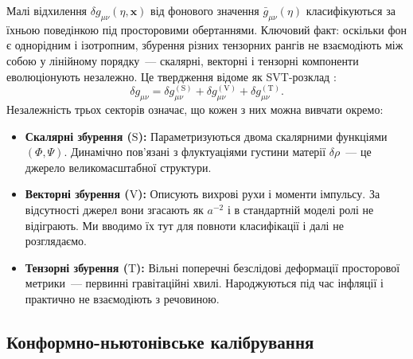\documentclass[12pt, a4paper]{article}
\begin{document}
Малі відхилення $\delta g_{\mu\nu}(\eta, \mathbf{x})$ від
фонового значення $\bar{g}_{\mu\nu}(\eta)$ класифікуються за
їхньою поведінкою під просторовими обертаннями. Ключовий факт:
оскільки фон є однорідним і ізотропним, збурення різних
тензорних рангів не взаємодіють між собою у лінійному порядку~---
скалярні, векторні і тензорні компоненти еволюціонують
незалежно. Це твердження відоме як SVT-розклад
\cite{stewart_walker_1974}:
\begin{equation}\label{eq:svt_decomposition}
  \delta g_{\mu\nu}
    = \delta g_{\mu\nu}^{(\mathrm{S})}
    + \delta g_{\mu\nu}^{(\mathrm{V})}
    + \delta g_{\mu\nu}^{(\mathrm{T})}.
\end{equation}
Незалежність трьох секторів означає, що кожен з них можна
вивчати окремо:
\begin{itemize}
  \item \textbf{Скалярні збурення ($\mathrm{S}$):}
        Параметризуються двома скалярними функціями
        $(\Phi, \Psi)$. Динамічно пов'язані з флуктуаціями
        густини матерії $\delta\rho$~--- це джерело
        великомасштабної структури.
  \item \textbf{Векторні збурення ($\mathrm{V}$):}
        Описують вихрові рухи і моменти імпульсу. За
        відсутності джерел вони згасають як $a^{-2}$
        \cite{mukhanov_2005} і в стандартній моделі ролі не
        відіграють. Ми вводимо їх тут для повноти
        класифікації і далі не розглядаємо.
  \item \textbf{Тензорні збурення ($\mathrm{T}$):}
        Вільні поперечні безслідові деформації просторової
        метрики~--- первинні гравітаційні хвилі. Народжуються
        під час інфляції і практично не взаємодіють з
        речовиною.
\end{itemize}

\subsection{Конформно-ньютонівське калібрування}
\end{document}
